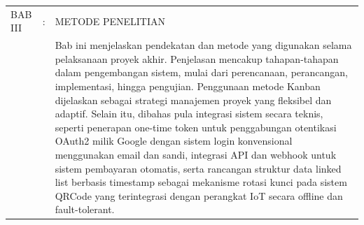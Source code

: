 \begin{longtable}{@{}llp{11cm}@{}}
    BAB III        & : & METODE PENELITIAN                                                                                                                                                                                                                                                                                                                                                                                                                                                                                                                                                                                                                                                                                                                                                                              \\
                   &   & Bab ini menjelaskan pendekatan dan metode yang digunakan selama pelaksanaan proyek akhir. Penjelasan mencakup tahapan-tahapan dalam pengembangan sistem, mulai dari perencanaan, perancangan, implementasi, hingga pengujian. Penggunaan metode Kanban dijelaskan sebagai strategi manajemen proyek yang fleksibel dan adaptif. Selain itu, dibahas pula integrasi sistem secara teknis, seperti penerapan one-time token untuk penggabungan otentikasi OAuth2 milik Google dengan sistem login konvensional menggunakan email dan sandi, integrasi API dan webhook untuk sistem pembayaran otomatis, serta rancangan struktur data linked list berbasis timestamp sebagai mekanisme rotasi kunci pada sistem QRCode yang terintegrasi dengan perangkat IoT secara offline dan fault-tolerant. \\[0.8em]


\end{longtable}
